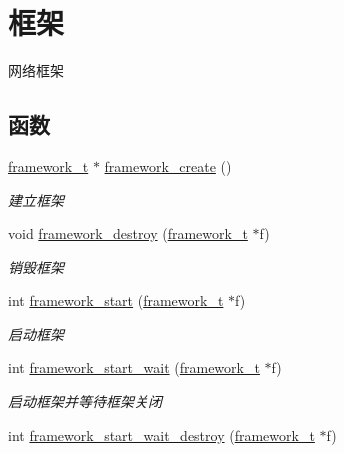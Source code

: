 \hypertarget{a00103}{}\section{框架}
\label{a00103}


网络框架  


\subsection*{函数}
\begin{DoxyCompactItemize}
\item 
\hyperlink{a00051_a6149d769f6f07ed14a40a271c95d8463_a6149d769f6f07ed14a40a271c95d8463}{framework\+\_\+t} $\ast$ \hyperlink{a00103_ga90b29a0c500209cb9b37437a32188a40_ga90b29a0c500209cb9b37437a32188a40}{framework\+\_\+create} ()
\begin{DoxyCompactList}\small\item\em 建立框架 \end{DoxyCompactList}\item 
void \hyperlink{a00103_gad1b6cb17014bfc515f8861bad3198e22_gad1b6cb17014bfc515f8861bad3198e22}{framework\+\_\+destroy} (\hyperlink{a00051_a6149d769f6f07ed14a40a271c95d8463_a6149d769f6f07ed14a40a271c95d8463}{framework\+\_\+t} $\ast$f)
\begin{DoxyCompactList}\small\item\em 销毁框架 \end{DoxyCompactList}\item 
int \hyperlink{a00103_ga23293faa7cc7d9f88ec73d4430a2355e_ga23293faa7cc7d9f88ec73d4430a2355e}{framework\+\_\+start} (\hyperlink{a00051_a6149d769f6f07ed14a40a271c95d8463_a6149d769f6f07ed14a40a271c95d8463}{framework\+\_\+t} $\ast$f)
\begin{DoxyCompactList}\small\item\em 启动框架 \end{DoxyCompactList}\item 
int \hyperlink{a00103_ga5fb7151fc13ce397884a7673b4fd319b_ga5fb7151fc13ce397884a7673b4fd319b}{framework\+\_\+start\+\_\+wait} (\hyperlink{a00051_a6149d769f6f07ed14a40a271c95d8463_a6149d769f6f07ed14a40a271c95d8463}{framework\+\_\+t} $\ast$f)
\begin{DoxyCompactList}\small\item\em 启动框架并等待框架关闭 \end{DoxyCompactList}\item 
int \hyperlink{a00103_ga4af709f98e2bd206da043cc29f915c99_ga4af709f98e2bd206da043cc29f915c99}{framework\+\_\+start\+\_\+wait\+\_\+destroy} (\hyperlink{a00051_a6149d769f6f07ed14a40a271c95d8463_a6149d769f6f07ed14a40a271c95d8463}{framework\+\_\+t} $\ast$f)

\end{DoxyCompactItemize}
